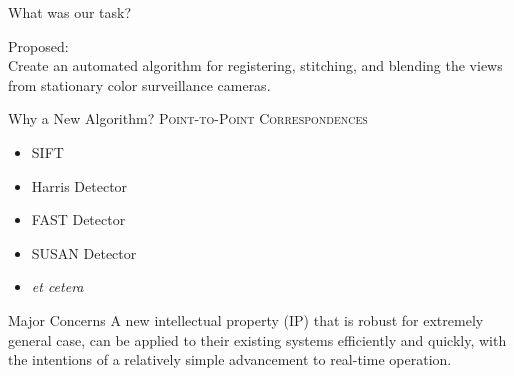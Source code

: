 \documentclass[serif]{beamer}
\begin{document}
\begin{frame}[c]{\sc What was our task?}

\begin{center}
{\sc Proposed}:
\\
Create an automated algorithm for registering, stitching, and blending the views from stationary color surveillance cameras.
\end{center}

\end{frame}




\begin{frame}[c]{\sc Why a New Algorithm?}
\centering
\textsc{Point-to-Point Correspondences}
\begin{itemize}
\item SIFT
\item Harris Detector
\item FAST Detector
\item SUSAN Detector
\item \textit{et cetera}
\end{itemize}

\begin{block}{\sc Major Concerns}
A new intellectual property (IP) that is robust for extremely general case, can be applied to their existing systems efficiently and quickly, with the intentions of a relatively simple advancement to real-time operation.
\end{block}

\end{frame}
\end{document}
